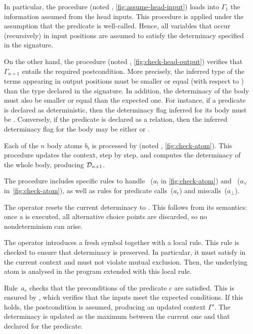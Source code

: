 In particular, the \checkhi procedure (noted \checkhiInfix, \cref{fig:assume-head-input})
loads into $\Gamma_1$ the information assumed from the head inputs.
This procedure is applied under the assumption that the predicate is
well-called. Hence, all variables that occur (recursively) in input
positions are assumed to satisfy the determinacy specified in the
signature.

On the other hand, the \checkho procedure
(noted \checkhoInfix, \cref{fig:check-head-output}) verifies that $\Gamma_{n+1}$ entails the
required postcondition. More precisely, the inferred type of the terms
appearing in output positions must be smaller or equal (with respect to
\mySub) than the type declared in the signature.
In addition, the determinacy of the body must also be smaller or equal than 
the expected
one. For instance, if a predicate is declared as deterministic, then the
determinacy flag inferred for its body must be \detI. Conversely, if the
predicate is declared as a relation, then the inferred determinacy flag for the
body may be either \detI or \relI.

Each of the $n$ body atoms $b_i$ is processed by \checka
(noted \checkaInfix, \cref{fig:check-atom}). This procedure updates the context, step by
step, and computes the determinacy of the whole body, producing
$\mathcal{D}_{n+1}$.

The \checka procedure includes specific rules to handle
\cut~($a_!$ in \cref{fig:check-atom}) and
\pi~($a_\forall$ in~\cref{fig:check-atom}), as well as rules for
predicate calls~($a_c$) and miscalls~($a_\bot$).

The \cut operator resets the current determinacy to \detI. This follows
from its semantics: once a \cut is executed, all alternative choice
points are discarded, so no nondeterminism can arise.

The \pi operator introduces a fresh symbol together with a local rule.
This rule is checked to ensure that determinacy is preserved. In
particular, it must satisfy \checkc in the current context and must
not violate mutual exclusion. Then, the underlying atom is analysed in
the program extended with this local rule.

Rule~$a_c$ checks that the preconditions of the predicate $c$ are
satisfied. This is ensured by \checkai, which verifies that the inputs
meet the expected conditions. If this holds, the postcondition is
assumed, producing an updated context $\Gamma'$. The determinacy is
updated as the maximum between the current one and that declared for
the predicate.

